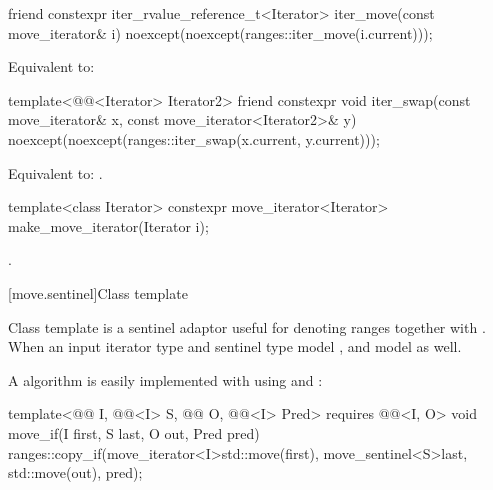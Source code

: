 %
\begin{itemdecl}
friend constexpr iter_rvalue_reference_t<Iterator>
  iter_move(const move_iterator& i)
    noexcept(noexcept(ranges::iter_move(i.current)));
\end{itemdecl}

\begin{itemdescr}
\pnum
\effects
Equivalent to: 
\end{itemdescr}

%
\begin{itemdecl}
template<@@<Iterator> Iterator2>
  friend constexpr void
    iter_swap(const move_iterator& x, const move_iterator<Iterator2>& y)
      noexcept(noexcept(ranges::iter_swap(x.current, y.current)));
\end{itemdecl}

\begin{itemdescr}
\pnum
\effects
Equivalent to: .
\end{itemdescr}

%
\begin{itemdecl}
template<class Iterator>
  constexpr move_iterator<Iterator> make_move_iterator(Iterator i);
\end{itemdecl}

\begin{itemdescr}
\pnum
\returns
{}.
\end{itemdescr}

[move.sentinel]{Class template }

\pnum
Class template  is a sentinel adaptor useful for denoting
ranges together with . When an input iterator type
 and sentinel type  model ,
 and  model
 as well.

\pnum
\begin{example}
A  algorithm is easily implemented with
 using  and :
\begin{codeblock}
template<@@ I, @@<I> S, @@ O,
         @@<I> Pred>
  requires @@<I, O>
void move_if(I first, S last, O out, Pred pred) {
  ranges::copy_if(move_iterator<I>{std::move(first)}, move_sentinel<S>{last},
                  std::move(out), pred);
}
\end{codeblock}
\end{example}

